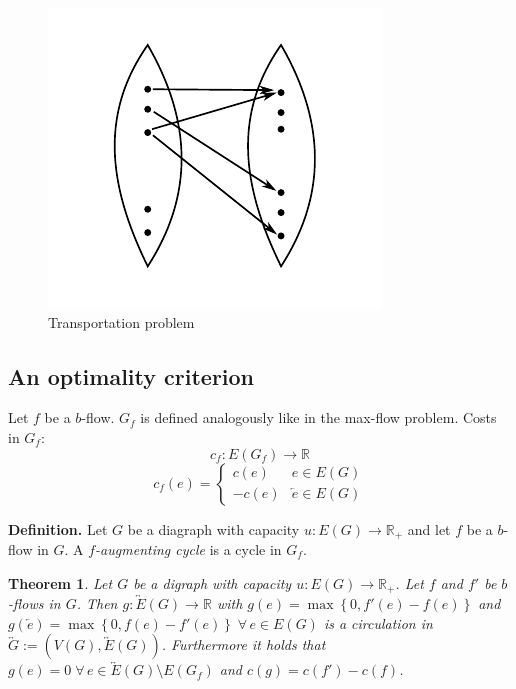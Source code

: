 \documentclass{article}
\newtheorem{theorem}{Theorem}
\newcommand{\set}[1]{\left\{#1\right\}}
\newcommand{\fall}{\;\forall\,}
\begin{document}
\begin{figure}[ht]
 \begin{center}
  \includegraphics{img/transportation_problem.pdf}
  \caption{Transportation problem}
 \end{center}
\end{figure}

\subsection{An optimality criterion}
%
Let $f$ be a $b$-flow. $G_f$ is defined analogously like in the max-flow problem. Costs in $G_f$:
\[
  c_f: E(G_f) \rightarrow \mathbb{R}
\] \[
  c_f(e) = \begin{cases}
    c(e) & e \in E(G) \\
    -c(e) & \overleftarrow{e} \in E(G)
  \end{cases}
\]

\textbf{Definition.}
  Let $G$ be a diagraph with capacity $u: E(G) \rightarrow \mathbb{R}_+$ and let $f$ be a $b$-flow in $G$.
  A \emph{$f$-augmenting cycle} is a cycle in $G_f$.

\begin{theorem}\label{proposition-5.1}
  Let $G$ be a digraph with capacity $u: E(G) \rightarrow \mathbb{R}_+$. Let $f$ and $f'$ be $b$-flows in $G$. Then $g: \overleftrightarrow{E}(G) \rightarrow \mathbb{R}$ with $g(e) = \max\set{0,f'(e) - f(e)}$ and $g(\overleftarrow{e}) = \max\set{0, f(e) - f'(e)} \fall e \in E(G)$ is a \emph{circulation} in $\overleftrightarrow{G} := (V(G), \overleftrightarrow{E}(G))$. Furthermore it holds that $g(e) = 0 \fall e \in \overleftrightarrow E(G) \setminus E(G_f)$ and $c(g) = c(f') - c(f)$.
\end{theorem}
\end{document}
